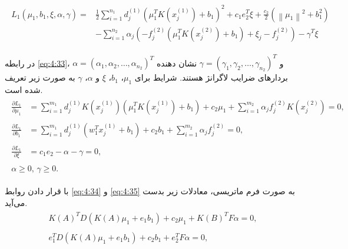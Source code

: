 \begin{align}\label{eq:4:33}
\begin{aligned}
L_{1}(\mu_{1},b_{1},\xi, \alpha, \gamma)= &\frac{1}{2}\sum\limits_{i=1}^{n_{1}}{d^{(1)}_{j}(\mu^{T}_{1}K(x^{(1)}_{j})+b_{1})^{2}}+c_{1}e_{2}^{T}\xi+\frac{c_{2}}{2}(\left\|\mu_{1}\right\|^{2}+b^{2}_{1}) \\
& -\sum\limits_{i=1}^{n_{2}}{\alpha_{j}(-f^{(2)}_{j}(\mu^{T}_{1}K(x^{(2)}_{j})+b_{1})+\xi_{j} - f^{(2)}_{j})} - \gamma^{T}\xi
\end{aligned}
\end{align}

در رابطه \ref{eq:4:33}،  $\alpha=(\alpha_{1}, \alpha_{2}, \dots,\alpha_{n_{2}})^{T}$ و  $\gamma=(\gamma_{1}, \gamma_{2}, \dots, \gamma_{n_{2}})^{T}$ نشان دهنده بردارهای ضرایب لاگرانژ هستند. شرایط  برای  $\mu_{1}$،  $b_{1}$،  $\xi$ و $\alpha$، $\gamma$  به صورت زیر تعریف شده است.
\begin{align}
\label{eq:4:34}
\begin{split}
\frac{\partial L_{1}}{\partial \mu_{1}}&= \sum\limits_{i=1}^{m_{1}}{d^{(1)}_{j}K(x^{(1)}_{j})(\mu^{T}_{1}K(x^{(1)}_{j}) + b_{1})} + c_{2}\mu_{1} + \sum\limits_{i=1}^{m_{2}}{\alpha_{j}f_{j}^{(2)}K(x_{j}^{(2)})}=0,
\end{split} \\
\label{eq:4:35}
\begin{split}
\frac{\partial L_{1}}{\partial b_{1}}&= \sum\limits_{i=1}^{m_{1}}{d^{(1)}_{j}(w^{T}_{1}x^{(1)}_{j} + b_{1})} + c_{2}b_{1} +\sum\limits_{i=1}^{m_{2}}{\alpha_{j}f_{j}^{(2)}}=0,
\end{split}\\
\label{eq:4:36}
\begin{split}
\frac{\partial L_{1}}{\partial \xi}&= c_{1}e_{2} - \alpha - \gamma =0,
\end{split}\\
\label{eq:4:37}
\begin{split}
\alpha \geq 0,\, \gamma \geq 0.
\end{split}
\end{align}

با قرار دادن روابط \ref{eq:4:34} و \ref{eq:4:35} به صورت فرم ماتریسی، معادلات زیر بدست می‌آید.
\begin{align}
\label{eq:4:38}
\begin{split}
K(A)^{T}D(K(A)\mu_{1}+e_{1}b_{1})+c_{2}\mu_{1}+K(B)^{T}F\alpha=0,
\end{split} \\
\label{eq:4:39}
\begin{split}
e^{T}_{1}D(K(A)\mu_{1}+e_{1}b_{1}) + c_{2}b_{1}+e^{T}_{2}F\alpha=0,
\end{split}
\end{align}

